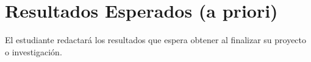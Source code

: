 \chapter{Resultados Esperados (a priori)}
El estudiante redactará los resultados que espera obtener al finalizar su proyecto o investigación.
